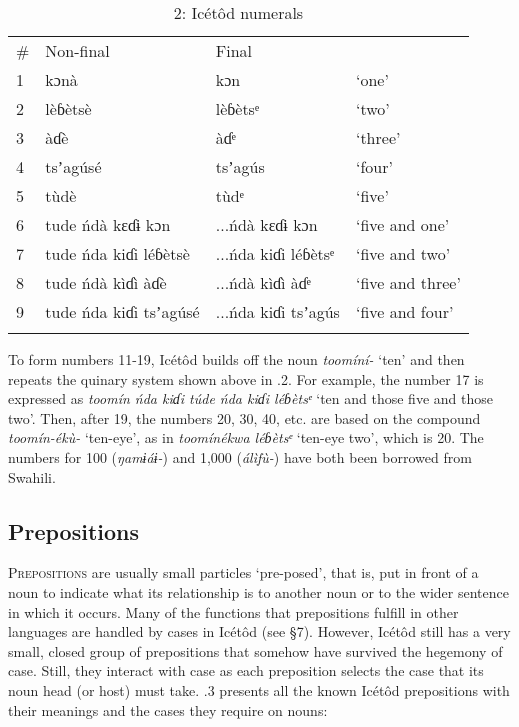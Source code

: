 \begin{table}
\caption{2: Icétôd numerals}
\label{tab:3}


\begin{tabularx}{\textwidth}{XXXX}
\lsptoprule

\# & Non-final & Final & \\
1 & kɔnà & kɔn & ‘one’\\
2 & lèɓètsè & lèɓètsᵉ & ‘two’\\
3 & àɗè & àɗᵉ & ‘three’\\
4 & tsʼagúsé & tsʼagús & ‘four’\\
5 & tùdè & tùdᵉ & ‘five’\\
6 & tude ńdà kɛɗɨ kɔn & ...ńdà kɛɗɨ kɔn & ‘five and one’\\
7 & tude ńda kiɗi léɓètsè & ...ńda kiɗi léɓètsᵉ & ‘five and two’\\
8 & tude ńdà kìɗì àɗè & ...ńdà kìɗì àɗᵉ & ‘five and three’\\
9 & tude ńda kiɗi tsʼagúsé & ...ńda kiɗi tsʼagús & ‘five and four’\\
\lspbottomrule
\end{tabularx}
\end{table}
To form numbers 11-19, Icétôd builds off the noun \textit{toomíní-} ‘ten’ and then repeats the quinary system shown above in .2. For example, the number 17 is expressed as \textit{toomín ńda kiɗi túde ńda kiɗi léɓètsᵉ} ‘ten and those five and those two’. Then, after 19, the numbers 20, 30, 40, etc. are based on the compound \textit{toomín-ékù-} ‘ten-eye’, as in \textit{toomínékwa léɓètsᵉ} ‘ten-eye two’, which is 20. The numbers for 100 (\textit{ŋamɨáɨ-}) and 1,000 (\textit{álìfù-}) have both been borrowed from Swahili.
 
\subsection{Prepositions}


\textsc{Prepositions} are usually small particles ‘pre-posed’, that is, put in front of a noun to indicate what its relationship is to another noun or to the wider sentence in which it occurs. Many of the functions that prepositions fulfill in other languages are handled by cases in Icétôd (see §7). However, Icétôd still has a very small, closed group of prepositions that somehow have survived the hegemony of case. Still, they interact with case as each preposition selects the case that its noun head (or host) must take. .3 presents all the known Icétôd prepositions with their meanings and the cases they require on nouns:


